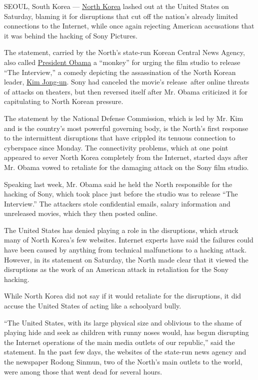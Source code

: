 SEOUL, South Korea ---
\href{http://topics.nytimes.com/top/news/international/countriesandterritories/northkorea/index.html?inline=nyt-geo}{North
Korea} lashed out at the United States on Saturday, blaming it for
disruptions that cut off the nation's already limited connections to the
Internet, while once again rejecting American accusations that it was
behind the hacking of Sony Pictures.

The statement, carried by the North's state-run Korean Central News
Agency, also called
\href{http://topics.nytimes.com/top/reference/timestopics/people/o/barack_obama/index.html?inline=nyt-per}{President
Obama} a ``monkey'' for urging the film studio to release ``The
Interview,'' a comedy depicting the assassination of the North Korean
leader,
\href{http://topics.nytimes.com/top/reference/timestopics/people/k/kim_jongun/index.html?inline=nyt-per}{Kim
Jong-un}. Sony had canceled the movie's release~after online threats of
attacks on theaters, but then reversed itself after Mr. Obama criticized
it for capitulating to North Korean pressure.

The statement by the National Defense Commission, which is led by Mr.
Kim and is the country's most powerful governing body, is the North's
first response to the intermittent disruptions that have crippled its
tenuous connection to cyberspace since Monday. The connectivity
problems, which at one point appeared to sever North Korea completely
from the Internet, started days after Mr. Obama vowed to retaliate for
the damaging attack on the Sony film studio.

Speaking last week, Mr. Obama said he held the North responsible for the
hacking of Sony, which took place just before the studio was to release
``The Interview.'' The attackers stole confidential emails, salary
information and unreleased movies, which they then posted online.

The United States has denied playing a role in the disruptions, which
struck many of North Korea's few websites. Internet experts have said
the failures could have been caused by anything from technical
malfunctions to a hacking attack. However, in its statement on Saturday,
the North made clear that it viewed the disruptions as the work of an
American attack in retaliation for the Sony hacking.

While North Korea did not say if it would retaliate for the disruptions,
it did accuse the United States of acting like a schoolyard bully.

``The United States, with its large physical size and oblivious to the
shame of playing hide and seek as children with runny noses would, has
begun disrupting the Internet operations of the main media outlets of
our republic,'' said the statement. In the past few days, the websites
of the state-run news agency and the newspaper Rodong Sinmun, two of the
North's main outlets to the world, were among those that went dead for
several hours.


